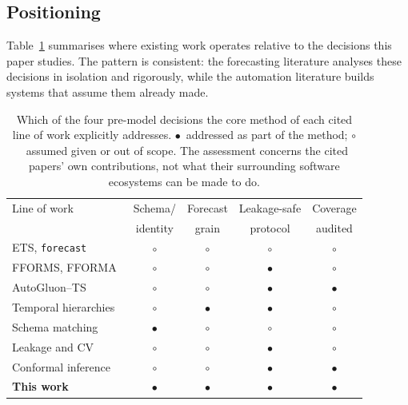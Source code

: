 \documentclass[conference]{IEEEtran}
\begin{document}
\subsection{Positioning}

Table~\ref{tab:related} summarises where existing work operates relative to
the decisions this paper studies. The pattern is consistent: the forecasting
literature analyses these decisions in isolation and rigorously, while the
automation literature builds systems that assume them already made.

\begin{table}[!t]
\caption{Which of the four pre-model decisions the core method of each cited
line of work explicitly addresses. \textmd{$\bullet$~addressed as part of the
method; $\circ$~assumed given or out of scope. The assessment concerns the
cited papers' own contributions, not what their surrounding software
ecosystems can be made to do.}}
\label{tab:related}
\centering
\footnotesize
\setlength{\tabcolsep}{4pt}
\begin{tabular}{@{}lcccc@{}}
\toprule
Line of work & Schema/ & Forecast & Leakage-safe & Coverage \\
             & identity & grain    & protocol     & audited \\
\midrule
ETS, \texttt{forecast}~\cite{hyndman2002statespace,hyndman2008forecastpkg} & $\circ$ & $\circ$ & $\circ$ & $\circ$ \\
FFORMS, FFORMA~\cite{talagala2023fforms,monteromanso2020fforma}           & $\circ$ & $\circ$ & $\bullet$ & $\circ$ \\
AutoGluon--TS~\cite{shchur2023autogluon}                                  & $\circ$ & $\circ$ & $\bullet$ & $\bullet$ \\
Temporal hierarchies~\cite{athanasopoulos2017temporal}                    & $\circ$ & $\bullet$ & $\bullet$ & $\circ$ \\
Schema matching~\cite{rahm2001schema,hulsebos2019sherlock}                & $\bullet$ & $\circ$ & $\circ$ & $\circ$ \\
Leakage and CV~\cite{kaufman2012leakage,bergmeir2012cv}                   & $\circ$ & $\circ$ & $\bullet$ & $\circ$ \\
Conformal inference~\cite{lei2018distfree,xu2021enbpi}                    & $\circ$ & $\circ$ & $\bullet$ & $\bullet$ \\
\textbf{This work}                                                        & $\bullet$ & $\bullet$ & $\bullet$ & $\bullet$ \\
\bottomrule
\end{tabular}
\end{table}
\end{document}
